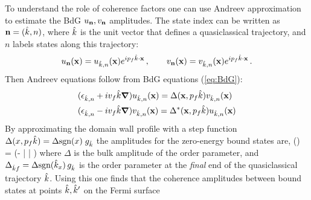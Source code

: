 \documentclass[prb,aps,showpacs,amsmath,twocolumn,10pt]{revtex4-1}
\newcommand{\sign}{\mbox{sgn}}
\begin{document}
To understand the role of coherence factors one can use Andreev approximation to estimate the BdG
$u_{\bf n},v_{\bf n}$ amplitudes. 
The state index can be written as ${\bf n}=(\hat{k},n)$, where $\hat{k}$ is the unit vector that defines a quasiclassical
trajectory, and $n$ labels states along this trajectory:
$$
u_{\bf n}({\bf x}) = u_{\hat{k},n}({\bf x}) e^{ip_f \hat{k} \cdot {\bf x}}  \,,
\qquad
v_{\bf n}({\bf x}) = v_{\hat{k},n}({\bf x}) e^{ip_f \hat{k} \cdot {\bf x}}  \,.
$$
Then Andreev equations follow from BdG equations (\ref{eq:BdG}): 
\begin{align}
\begin{split}
& (\epsilon_{\hat{k},n} + iv_f \hat{k}\mbox{\boldmath$\nabla$}) u_{\hat{k},n}({\bf x}) = \Delta({\bf x},p_f\hat{k}) v_{\hat{k},n}({\bf x}) 
\\
& (\epsilon_{\hat{k},n} - iv_f \hat{k}\mbox{\boldmath$\nabla$}) v_{\hat{k},n}({\bf x}) = \Delta^*({\bf x},p_f\hat{k}) u_{\hat{k},n}({\bf x}) 
\end{split}
\label{eq:Andreev}
\end{align}
By approximating the domain wall profile with a step function 
$\Delta(x, p_f \hk) = \Delta \sign(x) \; g_{\hk}$
the amplitudes for the zero-energy bound states are, 
\be
\label{eq:uv_andreev}
\left[ \begin{array}{c}
u_{\hk,n} \\ v_{\hk,n}
\end{array} \right] (\vx)
=  
\left[ \begin{array}{c}
1  \\ -i \; \sign(\Delta^*_{\hk f}) 
\end{array} \right] 
\exp\left(- \left|  \right| \right)
\ee
where $\Delta$ is the bulk amplitude of the order parameter, %
and $\Delta_{\hk f} = \Delta \sign(\hk_x) \, g_{\hk}$ 
is the order parameter at the \emph{final} end of the quasiclassical trajectory $\hat{k}$. 
Using this one finds that the coherence amplitudes
between bound states at points $\hat{k}, \hat{k}'$ on the Fermi surface 
\end{document}
